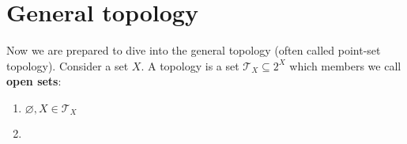 %
%
%

\chapter{General topology}
\label{general_topology}
Now we are prepared to dive into the general topology (often called point-set topology).
Consider a set $X$. A topology is a set $\mathcal{T}_X \subseteq 2^X $ which members we call \textbf{open sets}:
\begin{enumerate}
	\item $\varnothing, X\in \mathcal{T}_X$
	\item 
\end{enumerate}